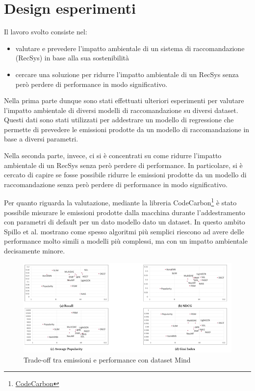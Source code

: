 \section{Design esperimenti}



\noindent Il lavoro svolto consiste nel: 
\begin{itemize}
    \item valutare e prevedere l'impatto ambientale di un sistema di raccomandazione (RecSys) in base alla sua sostenibilità
    \item cercare una soluzione per ridurre l'impatto ambientale di un RecSys senza però perdere di performance in modo significativo.
\end{itemize}

\noindent Nella prima parte dunque sono stati effettuati ulteriori esperimenti per valutare l'impatto ambientale di diversi modelli di raccomandazione su diversi dataset. Questi dati sono stati utilizzati per addestrare un modello di regressione che permette di prevedere le emissioni prodotte da un modello di raccomandazione in base a diversi parametri.


\noindent Nella seconda parte, invece, ci si è concentrati su come ridurre l'impatto ambientale di un RecSys senza però perdere di performance. In particolare, si è cercato di capire se fosse possibile ridurre le emissioni prodotte da un modello di raccomandazione senza però perdere di performance in modo significativo.



\noindent Per quanto riguarda la valutazione, mediante la libreria CodeCarbon\footnote{\href{http://codecarbon.io}{CodeCarbon}}{} è stato possibile misurare le emissioni prodotte dalla macchina durante l'addestramento con parametri di default per un dato modello dato un dataset. 
In questo ambito  Spillo et al.\cite{spillo2023towards} mostrano come spesso algoritmi più semplici riescono ad avere delle performance molto simili a modelli più complessi, ma con un impatto ambientale decisamente minore.

\begin{figure}[H]
    \centering
    \includegraphics[scale=0.75]{images/risultati-valutazione.png}
    \caption{Trade-off tra emissioni e performance con dataset Mind}


\end{figure}
\newpage




